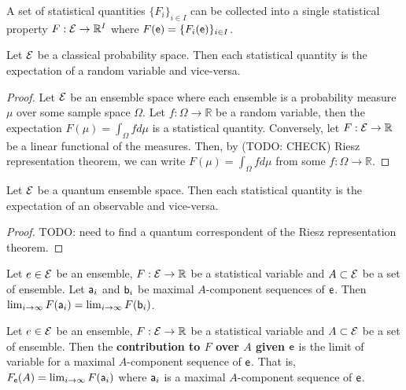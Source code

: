 \begin{coro}
	A set of statistical quantities $\{F_i\}_{i \in I}$ can be collected into a single statistical property $F : \Ens \to \mathbb{R}^I$ where $F(\ens) = \{F_i(\ens)\}_{i \in I}$.
\end{coro}

\begin{prop}
	Let $\Ens$ be a classical probability space. Then each statistical quantity is the expectation of a random variable and vice-versa.
\end{prop}

\begin{proof}
	Let $\Ens$ be an ensemble space where each ensemble is a probability measure $\mu$ over some sample space $\Omega$. Let $f : \Omega \to \mathbb{R}$ be a random variable, then the expectation $F(\mu) = \int_{\Omega} f d\mu$ is a statistical quantity. Conversely, let $F : \Ens \to \mathbb{R}$ be a linear functional of the measures. Then, by (TODO: CHECK) Riesz representation theorem, we can write $F(\mu) = \int_{\Omega} f d\mu$ from some $f : \Omega \to \mathbb{R}$.
\end{proof}

\begin{conj}
	Let $\Ens$ be a quantum ensemble space. Then each statistical quantity is the expectation of an observable and vice-versa.
\end{conj}

\begin{proof}
	TODO: need to find a quantum correspondent of the Riesz representation theorem.
\end{proof}

\begin{conj}
	Let $e \in \Ens$ be an ensemble, $F : \Ens \to \mathbb{R}$ be a statistical variable and $A \subset \Ens$ be a set of ensemble. Let $\ens[a]_i$ and $\ens[b]_i$ be maximal $A$-component sequences of $\ens$. Then $\lim_{i \to \infty} F(\ens[a]_i) = \lim_{i \to \infty} F(\ens[b]_i)$.
\end{conj}

\begin{defn}
	Let $e \in \Ens$ be an ensemble, $F : \Ens \to \mathbb{R}$ be a statistical variable and $A \subset \Ens$ be a set of ensemble. Then the \textbf{contribution to $F$ over $A$ given $\ens$} is the limit of variable for a maximal $A$-component sequence of $\ens$. That is, $F_{\ens}(A) = \lim_{i \to \infty} F(\ens[a]_i)$ where $\ens[a]_i$ is a maximal $A$-component sequence of $\ens$.
\end{defn}

